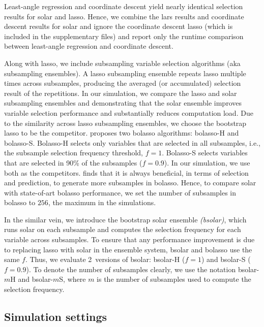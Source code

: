 \documentclass[12pt]{article}
\begin{document}
Least-angle regression and coordinate descent yield nearly identical selection results for solar and lasso. Hence, we combine the lars results and coordinate descent results for solar and ignore the coordinate descent lasso (which is included in the supplementary files) and report only the runtime comparison between least-angle regression and coordinate descent.

Along with lasso, we include subsampling variable selection algorithms (aka subsampling ensembles). A lasso subsampling ensemble repeats lasso multiple times across subsamples, producing the averaged (or accumulated) selection result of the repetitions. In our simulation, we compare the lasso and solar subsampling ensembles and demonstrating that the solar ensemble improves variable selection performance and substantially reduces computation load. Due to the similarity across lasso subsampling ensembles, we choose the bootstrap lasso \citep{bach2008bolasso} to be the competitor. \citet{bach2008bolasso} proposes two bolasso algorithms: bolasso-H and bolasso-S. Bolasso-H selects only variables that are selected in all subsamples, i.e., the subsample selection frequency threshold, $f=1$. Bolasso-S selects variables that are selected in 90\% of the subsamples ($f=0.9$). In our simulation, we use both as the competitors. \citet{bach2008bolasso} finds that it is always beneficial, in terms of selection and prediction, to generate more subsamples in bolasso. Hence, to compare solar with state-of-art bolasso performance, we set the number of subsamples in bolasso to $256$, the maximum in the \citet{bach2008bolasso} simulations.

In the similar vein, we introduce the bootstrap solar ensemble \emph{(bsolar)}, which runs solar on each subsample and computes the selection frequency for each variable across subsamples. To ensure that any performance improvement is due to replacing lasso with solar in the ensemble system, bsolar and bolasso use the same $f$. Thus, we evaluate 2~versions of bsolar: bsolar-H ($f=1$) and bsolar-S ($f=0.9$). To denote the number of subsamples clearly, we use the notation bsolar-$m$H and bsolar-$m$S, where $m$ is the number of subsamples used to compute the selection frequency.

\subsection{Simulation settings}
\end{document}
